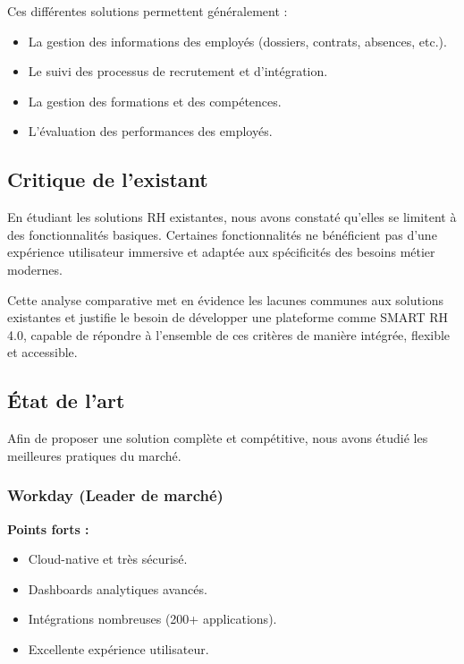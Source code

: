 Ces différentes solutions permettent généralement :

\begin{itemize}
    \item La gestion des informations des employés (dossiers, contrats, absences, etc.).
    \item Le suivi des processus de recrutement et d'intégration.
    \item La gestion des formations et des compétences.
    \item L'évaluation des performances des employés.
\end{itemize}

\subsection{Critique de l'existant}

En étudiant les solutions RH existantes, nous avons constaté qu'elles se limitent à des fonctionnalités basiques. Certaines fonctionnalités ne bénéficient pas d'une expérience utilisateur immersive et adaptée aux spécificités des besoins métier modernes.

Cette analyse comparative met en évidence les lacunes communes aux solutions existantes et justifie le besoin de développer une plateforme comme SMART RH 4.0, capable de répondre à l'ensemble de ces critères de manière intégrée, flexible et accessible.

\subsection{État de l'art}

Afin de proposer une solution complète et compétitive, nous avons étudié les meilleures pratiques du marché.

\subsubsection*{Workday (Leader de marché)}

\textbf{Points forts :}
\begin{itemize}
    \item Cloud-native et très sécurisé.
    \item Dashboards analytiques avancés.
    \item Intégrations nombreuses (200+ applications).
    \item Excellente expérience utilisateur.
\end{itemize}

